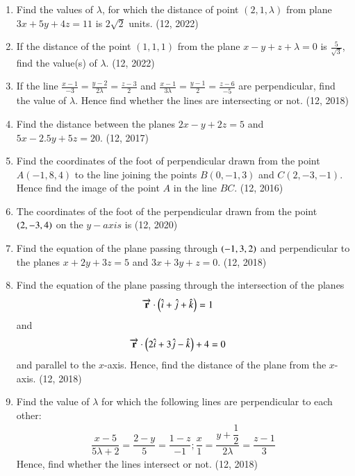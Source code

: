 \begin{enumerate}[label=\thesubsection.\arabic*, ref=\thesubsection.\theenumi]
\item Find the values of $\lambda$, for which the distance of point $(2,1,\lambda)$ from plane $3x+5y+4z=11$ is $2\sqrt{2}$ units. \hfill (12, 2022)
\item If the distance of the point $(1,1,1)$ from the plane $x-y+z+\lambda=0$ is $\frac{5}{\sqrt{3}}$, find the value(s) of $\lambda$. \hfill (12, 2022)
\item If the line $\frac{x-1}{-3} = \frac{y-2}{2\lambda} = \frac{z-3}{2} $ and $\frac{x-1}{3\lambda} = \frac{y-1}{2}  = \frac{z-6}{-5} $ are perpendicular, find the value of $\lambda$. Hence find whether the lines are intersecting or not. \hfill (12, 2018)
\item Find the distance between the planes $2x - y + 2z = 5$ and $5x - 2.5y + 5z = 20$. \hfill (12, 2017)
\item Find the coordinates of the foot of perpendicular drawn from the point
      $A(-1, 8, 4)$ to the line joining the points $B(0, -1, 3)$ and $C(2,-3,-1)$. Hence
      find the image of the point $A$ in the line $BC$. \hfill (12, 2016)
\item The coordinates of the foot of the perpendicular drawn from the point $\left(2,-3,4\right)$ on the $y-axis$ is
\hfill (12, 2020)
\item Find the equation of the plane passing through $\left(-1,3,2\right)$ and perpendicular to the planes $x+2y+3z=5$ and $3x+3y+z=0$.
\hfill (12, 2018)
\item Find the equation of the plane passing through the intersection of the planes 
\begin{align*}
	\overrightarrow{\mathbf{r}} \cdot \left(\hat{i} + \hat{j} + \hat{k}\right) &= 1
\end{align*}
and 
\begin{align*}
	\overrightarrow{\mathbf{r}} \cdot \left(2\hat{i} + 3\hat{j} - \hat{k} \right) + 4 &= 0
\end{align*}
and parallel to the $x$-axis. Hence, find the distance of the plane from the $x$-axis. \hfill (12, 2018)
 \item Find the value of $\lambda$ for which the following lines are perpendicular to each other:
 \begin{align*}
 \dfrac{x-5}{5\lambda+2}= \dfrac{2-y}{5} = \dfrac{1-z}{-1};\dfrac{x}{1}=\dfrac{y+\dfrac{1}{2}}{2\lambda}=\dfrac{z-1}{3} 
 \end{align*}
Hence, find whether the lines intersect or not.
\hfill (12, 2018)
\end{enumerate}
